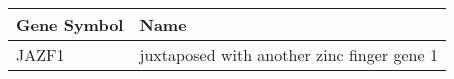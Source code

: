 \begin{tabular}{ll}
\toprule
Gene Symbol &                                       Name \\
\midrule
      JAZF1 & juxtaposed with another zinc finger gene 1 \\
\bottomrule
\end{tabular}
